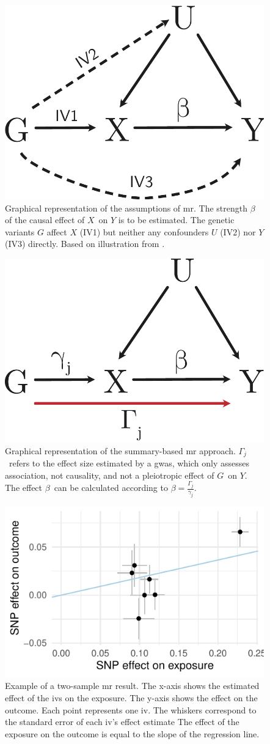 \documentclass[twoside=false]{scrbook}
\begin{document}
\begin{figure}
    \centering
    \includegraphics[width=.3\textwidth]{img/mr_graph.pdf}
    \caption{Graphical representation of the assumptions of \gls{mr}.
    The strength $\beta$ of the causal effect of $X$ on $Y$ is to be estimated.
    The genetic variants $G$ affect $X$ (IV1) but neither any confounders $U$ (IV2) nor $Y$ (IV3) directly.
    Based on illustration from \cite{J2015}.}
    \label{fig:mr}
\end{figure}

\begin{figure}
    \centering
    \includegraphics[width=.3\textwidth]{img/two_sample_mr.pdf}
    \caption{Graphical representation of the summary-based \gls{mr} approach.
        $\Gamma_j$ refers to the effect size estimated by a \gls{gwas}, which only assesses association, not causality, and not a pleiotropic effect of $G$ on $Y$.
        The effect $\beta$ can be calculated according to $\beta=\frac{\Gamma_j}{\gamma_j}$.
    }
    \label{fig:two-sample-mr}
\end{figure}

\begin{figure}
    \centering
    \includegraphics[width=.6\textwidth]{img/mr_example.pdf}
    \caption{Example of a two-sample \gls{mr} result.
    The x-axis shows the estimated effect of the \glspl{iv} on the exposure.
    The y-axis shows the effect on the outcome.
    Each point represents one \gls{iv}.
    The whiskers correspond to the standard error of each \gls{iv}'s effect estimate
    The effect of the exposure on the outcome is equal to the slope of the regression line.}
    \label{fig:twosample-example}
\end{figure}
\end{document}
